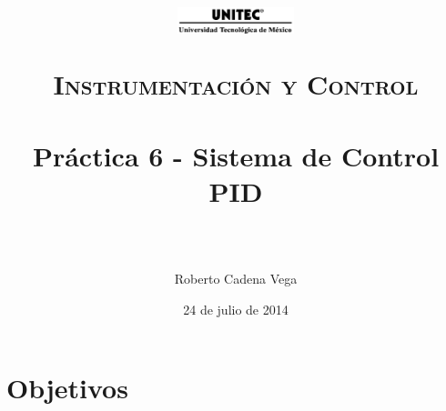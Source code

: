 



\title{
	\normalfont \normalsize
	\begin{figure}[h]
		\begin{center}
			\includegraphics[width=0.3\textwidth]{../images/UNITEC.png} %
		\end{center}
	\end{figure}
	\textsc{Instrumentación y Control} \\ [25pt]
	\horrule{0.5pt} \\[0.4cm] %
	\huge Práctica 6 - Sistema de Control PID \\ %
	\horrule{2pt} \\[0.5cm] %
}

\author{Roberto Cadena Vega} %

\date{\normalsize 24 de julio de 2014} %




\maketitle %


\section{Objetivos}

